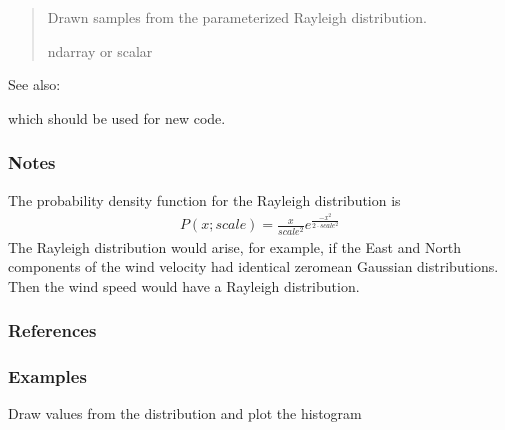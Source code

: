 \documentclass[letterpaper,10pt,english]{sphinxmanual}
\begin{document}
\begin{fulllineitems}
\begin{quote}
\begin{description}
\begin{itemize}
\end{itemize}

\sphinxAtStartPar
{} \textendash{} Drawn samples from the parameterized Rayleigh distribution.

\sphinxAtStartPar
ndarray or scalar

\end{description}\end{quote}


\begin{sphinxseealso}{See also:}
\begin{description}
\sphinxAtStartPar
which should be used for new code.

\end{description}


\end{sphinxseealso}

\subsubsection*{Notes}

\sphinxAtStartPar
The probability density function for the Rayleigh distribution is
\begin{equation*}
\begin{split}P(x;scale) = \frac{x}{scale^2}e^{\frac{-x^2}{2 \cdotp scale^2}}\end{split}
\end{equation*}
\sphinxAtStartPar
The Rayleigh distribution would arise, for example, if the East
and North components of the wind velocity had identical zero\sphinxhyphen{}mean
Gaussian distributions.  Then the wind speed would have a Rayleigh
distribution.
\subsubsection*{References}
\subsubsection*{Examples}

\sphinxAtStartPar
Draw values from the distribution and plot the histogram

\begin{sphinxVerbatim}[commandchars=\\\{\}]
   
     
\end{sphinxVerbatim}


\end{fulllineitems}
\end{document}
